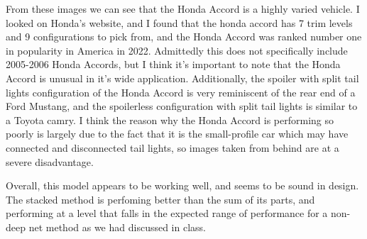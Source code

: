 \documentclass[12pt]{article}
\begin{document}
From these images we can see that the Honda Accord is a highly varied vehicle. I looked on Honda's website, and I found 
that the honda accord has 7 trim levels and 9 configurations to pick from, and the Honda Accord was ranked number one 
in popularity in America in 2022. Admittedly this does not specifically include 2005-2006 Honda Accords, but I think it's 
important to note that the Honda Accord is unusual in it's wide application. Additionally, the spoiler with split tail lights
configuration of the Honda Accord is very reminiscent of the rear end of a Ford Mustang, and the spoilerless configuration with
split tail lights is similar to a Toyota camry. I think the reason why the Honda Accord is performing so poorly is largely 
due to the fact that it is the small-profile car which may have connected and disconnected tail lights, so images taken 
from behind are at a severe disadvantage.

Overall, this model appears to be working well, and seems to be sound in design. The stacked method is perfoming better 
than the sum of its parts, and performing at a level that falls in the expected range of performance for a non-deep net method
as we had discussed in class. 
\end{document}
